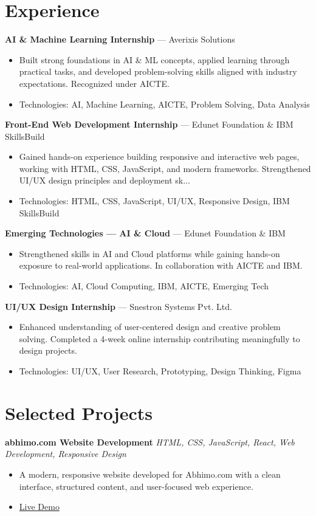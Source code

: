 \documentclass[10pt,letterpaper]{article}
\begin{document}
\section{Experience}
\textbf{AI \& Machine Learning Internship} --- Averixis Solutions
\begin{itemize}
  \item Built strong foundations in AI \& ML concepts, applied learning through practical tasks, and developed problem-solving skills aligned with industry expectations. Recognized under AICTE.
  \item Technologies: AI, Machine Learning, AICTE, Problem Solving, Data Analysis
\end{itemize}
\vspace{3pt}
\textbf{Front-End Web Development Internship} --- Edunet Foundation \& IBM SkillsBuild
\begin{itemize}
  \item Gained hands-on experience building responsive and interactive web pages, working with HTML, CSS, JavaScript, and modern frameworks. Strengthened UI/UX design principles and deployment sk...
  \item Technologies: HTML, CSS, JavaScript, UI/UX, Responsive Design, IBM SkillsBuild
\end{itemize}
\vspace{3pt}
\textbf{Emerging Technologies — AI \& Cloud} --- Edunet Foundation \& IBM
\begin{itemize}
  \item Strengthened skills in AI and Cloud platforms while gaining hands-on exposure to real-world applications. In collaboration with AICTE and IBM.
  \item Technologies: AI, Cloud Computing, IBM, AICTE, Emerging Tech
\end{itemize}
\vspace{3pt}
\textbf{UI/UX Design Internship} --- Snestron Systems Pvt. Ltd.
\begin{itemize}
  \item Enhanced understanding of user-centered design and creative problem solving. Completed a 4-week online internship contributing meaningfully to design projects.
  \item Technologies: UI/UX, User Research, Prototyping, Design Thinking, Figma
\end{itemize}

\section{Selected Projects}
\textbf{abhimo.com Website Development} \hfill \textit{\small HTML, CSS, JavaScript, React, Web Development, Responsive Design}
\begin{itemize}
  \item A modern, responsive website developed for Abhimo.com with a clean interface, structured content, and user-focused web experience.
  \item \href{https://abhimo.com}{Live Demo}
\end{itemize}
\end{document}
